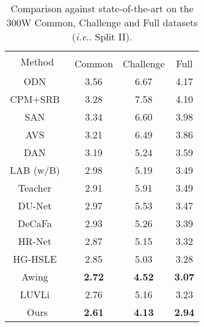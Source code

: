 \documentclass{bmvc2k}
\makeatletter
\DeclareRobustCommand\onedot{\futurelet\@let@token\@onedot}
\def\@onedot{\ifx\@let@token.\else.\null\fi\xspace}
\def\ie{\emph{i.e}\onedot} \def\Ie{\emph{I.e}\onedot}
\newcommand{\best}[1]{\color{red}\textbf{#1}}
\newcommand{\secondb}[1]{\color{blue}\textbf{#1}}
\makeatother
\begin{document}
\begin{table}[!htbp]
	\caption{Comparison against state-of-the-art on the 300W Common, Challenge and Full datasets (\ie Split II).}\label{tab:sota_300w_valid}
	\centering
		\begin{tabular}{cccc}
			\toprule
			\multirow{2}{*}{Method} &  \multicolumn{3}{c}{} \\
			\cline{2-4}
			& Common & Challenge & Full \\
			\midrule
			ODN~\cite{zhu2019robust} & 3.56 & 6.67 & 4.17 \\
			CPM+SRB~\cite{dong2018supervision} & 3.28 & 7.58 & 4.10 \\ 
            SAN~\cite{dong2018style} & 3.34 & 6.60 & 3.98 \\
            AVS~\cite{qian2019aggregation} & 3.21 & 6.49 & 3.86 \\
            DAN~\cite{kowalski2017deep} & 3.19 & 5.24 & 3.59 \\
            LAB (w/B)~\cite{wu2018look} & 2.98 & 5.19 & 3.49 \\
            Teacher~\cite{dong2019teacher} & 2.91 & 5.91 & 3.49 \\
            DU-Net~\cite{tang2019towards} & 2.97 & 5.53 & 3.47 \\
            DeCaFa~\cite{dapogny2019decafa} & 2.93 & 5.26 & 3.39 \\
            HR-Net~\cite{sun2019high} & 2.87 & 5.15 & 3.32 \\
            HG-HSLE~\cite{zou2019learning} & 2.85 & 5.03 & 3.28 \\
            Awing~\cite{wang2019adaptive} & \secondb{2.72} & \secondb{4.52} & \secondb{3.07} \\
            LUVLi~\cite{kumar2020luvli} & 2.76 & 5.16 & 3.23 \\
Ours & \best{2.61} & \best{4.13} &  \best{2.94} \\
			\bottomrule
		\end{tabular}
\end{table}
\end{document}
